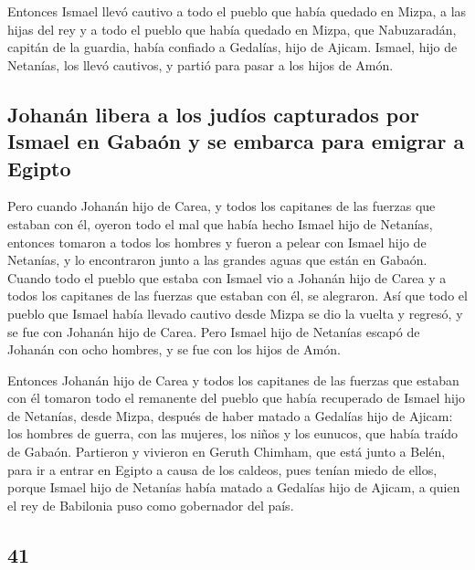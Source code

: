 \begin{paracol}{2}
 Entonces Ismael llevó cautivo a todo el pueblo que había
quedado en Mizpa, a las hijas del rey y a todo el pueblo que había
quedado en Mizpa, que Nabuzaradán, capitán de la guardia, había confiado
a Gedalías, hijo de Ajicam. Ismael, hijo de Netanías, los llevó
cautivos, y partió para pasar a los hijos de Amón.

\hypertarget{johanuxe1n-libera-a-los-juduxedos-capturados-por-ismael-en-gabauxf3n-y-se-embarca-para-emigrar-a-egipto}{%
\subsection{Johanán libera a los judíos capturados por Ismael en Gabaón
y se embarca para emigrar a
Egipto}\label{johanuxe1n-libera-a-los-juduxedos-capturados-por-ismael-en-gabauxf3n-y-se-embarca-para-emigrar-a-egipto}}

 Pero cuando Johanán hijo de Carea, y todos los capitanes
de las fuerzas que estaban con él, oyeron todo el mal que había hecho
Ismael hijo de Netanías,  entonces tomaron a todos los
hombres y fueron a pelear con Ismael hijo de Netanías, y lo encontraron
junto a las grandes aguas que están en Gabaón.  Cuando
todo el pueblo que estaba con Ismael vio a Johanán hijo de Carea y a
todos los capitanes de las fuerzas que estaban con él, se alegraron.
 Así que todo el pueblo que Ismael había llevado cautivo
desde Mizpa se dio la vuelta y regresó, y se fue con Johanán hijo de
Carea.  Pero Ismael hijo de Netanías escapó de Johanán
con ocho hombres, y se fue con los hijos de Amón.

 Entonces Johanán hijo de Carea y todos los capitanes de
las fuerzas que estaban con él tomaron todo el remanente del pueblo que
había recuperado de Ismael hijo de Netanías, desde Mizpa, después de
haber matado a Gedalías hijo de Ajicam: los hombres de guerra, con las
mujeres, los niños y los eunucos, que había traído de Gabaón.
 Partieron y vivieron en Geruth Chimham, que está junto a
Belén, para ir a entrar en Egipto  a causa de los
caldeos, pues tenían miedo de ellos, porque Ismael hijo de Netanías
había matado a Gedalías hijo de Ajicam, a quien el rey de Babilonia puso
como gobernador del país.

\switchcolumn
\begin{otherlanguage}{english}

\hypertarget{section-81}{%
\section{41}\label{section-81}}


\end{otherlanguage}
\end{paracol}
